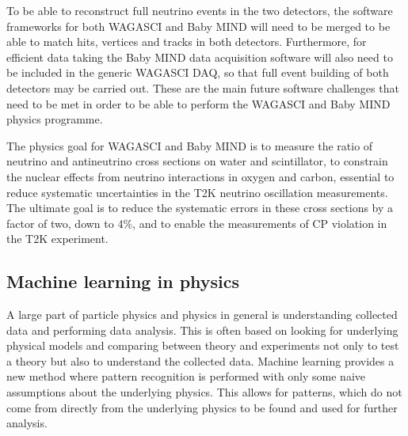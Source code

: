 
To be able to reconstruct full neutrino events in the two detectors, the software frameworks for both WAGASCI and Baby MIND will need to be merged to be able to match hits, vertices and tracks in both detectors. Furthermore, for efficient data taking the Baby MIND data acquisition software will also need to be included in the generic WAGASCI DAQ, so that full event building of both detectors may be carried out. These are the main future software challenges that need to be met in order to be able to perform the WAGASCI and Baby MIND physics programme. 

The physics goal for WAGASCI and Baby MIND is to measure the ratio of neutrino and antineutrino cross sections on water and scintillator, to constrain the nuclear effects from neutrino interactions in oxygen and carbon, essential to reduce systematic uncertainties in the T2K neutrino oscillation measurements. The ultimate goal is to reduce the systematic errors in these cross sections by a factor of two, down to 4\%, and to enable the measurements of CP violation in the T2K experiment.



\subsection{Machine learning in physics}

A large part of particle physics and physics in general is understanding collected data and performing data analysis. This is often based on looking for underlying physical models and comparing between theory and experiments not only to test a theory but also to understand the collected data. Machine learning provides a new method where pattern recognition is performed with only some naive assumptions about the underlying physics. This allows for patterns, which do not come from directly from the underlying physics to be found and used for further analysis.

